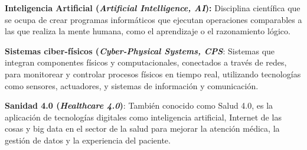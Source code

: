 \textbf{Inteligencia Artificial (\textit{Artificial Intelligence, AI}):} Disciplina científica que se ocupa de crear programas informáticos que ejecutan operaciones comparables a las que realiza la mente humana, como el aprendizaje o el razonamiento lógico. \cite{rae}














\textbf{Sistemas ciber-físicos (\textit{Cyber-Physical Systems, CPS}}: Sistemas que integran componentes físicos y computacionales, conectados a través de redes, para monitorear y controlar procesos físicos en tiempo real, utilizando tecnologías como sensores, actuadores, y sistemas de información y comunicación.

\textbf{Sanidad 4.0 (\textit{Healthcare 4.0})}: También conocido como Salud 4.0, es la aplicación de tecnologías digitales como inteligencia artificial, Internet de las cosas y big data en el sector de la salud para mejorar la atención médica, la gestión de datos y la experiencia del paciente.








